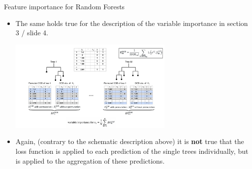 \documentclass[11pt,compress,t,notes=noshow, xcolor=table]{beamer}
\begin{document}
\begin{vbframe}{Feature importance for Random Forests}
\begin{itemize}
\item The same holds true for the description of the variable importance in section 3 / slide 4.
\begin{center}
\includegraphics[width = 8cm]{figure_man/rF_varImp_permutation_new.pdf}
\end{center}
\item Again, (contrary to the schematic description above) it is \textbf{not} true that the loss function is applied to each prediction of the single trees  individually, but is applied to the aggregation of these predictions. 
\end{itemize}
\end{vbframe}

\endlecture
\end{document}
